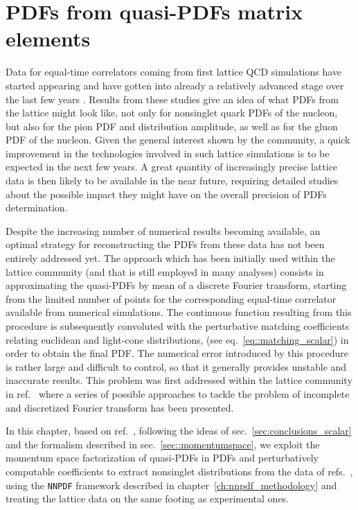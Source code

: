 \chapter{PDFs from quasi-PDFs matrix elements}
\label{ch:qpdfNNPDF}
Data for equal-time correlators coming from first lattice QCD simulations
have started appearing and have gotten into already a relatively advanced stage over the last few years
\cite{Lin:2014zya,Alexandrou:2015rja,Chen:2016utp,Alexandrou:2016jqi,Zhang:2017bzy,Alexandrou:2017huk,Lin:2017ani,Chen:2017gck,Alexandrou:2018pbm,Chen:2018xof,Chen:2018fwa,Alexandrou:2018eet,Liu:2018uuj,Lin:2018qky,Fan:2018dxu,Liu:2018hxv,Alexandrou:2019lfo,Izubuchi:2019lyk}.
Results from these studies give an idea of what PDFs from the lattice might look like, not only for
nonsinglet quark PDFs of the nucleon, but also for the pion PDF and distribution
amplitude, as well as for the gluon PDF of the nucleon. Given the general
interest shown by the community, a quick improvement in the technologies
involved in such lattice simulations is to be expected in the next few years. A
great quantity of increasingly precise lattice data is then likely to be
available in the near future, requiring detailed studies about the possible
impact they might have on the overall precision of PDFs determination.

Despite the increasing number of numerical results becoming available, an
optimal strategy for reconstructing the PDFs from these data has not been
entirely addressed yet. The approach which has been initially used within the lattice community
(and that is still employed in many analyses)
consists in approximating the quasi-PDFs by mean of a discrete Fourier transform,
starting from the limited number of points for the corresponding equal-time correlator available from numerical simulations. 
The continuous function resulting from this procedure
is subsequently convoluted with the perturbative matching coefficients relating euclidean and light-cone distributions,
(see eq.~\eqref{eq::matching_scalar}) in order to obtain the final PDF.
The numerical error introduced by this procedure is rather large and difficult to control,
so that it generally provides unstable and inaccurate results.
This problem was first addressed within the lattice community in ref.~\cite{Karpie2019}
where a series of possible approaches to tackle the problem of incomplete and discretized Fourier
transform has been presented.

In this chapter, based on ref.~\cite{Cichy:2019ebf}, following the ideas of sec.~\ref{sec:conclusions_scalar}
and the formalism described in sec.~\ref{sec::momentumspace}, we exploit the momentum space factorization
of quasi-PDFs in PDFs and perturbatively computable coefficients to extract nonsinglet distributions from the data of
refs.~\cite{Alexandrou:2018pbm,Alexandrou:2019lfo}, using the {\tt NNPDF} framework described
in chapter~\ref{ch:nnpdf_methodology} and treating the lattice data on the same footing as experimental ones.

